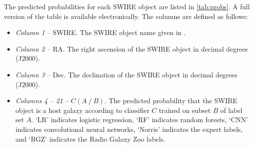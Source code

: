 \documentclass[fleqn,usenatbib,usedcolumn]{mnras}
\begin{document}
  The predicted probabilities for each SWIRE object are listed in \autoref{tab:probs}. A full version of the table is available electronically.  The columns are defined as follows:
  \begin{itemize}
    \item {\em Column 1}  -- SWIRE. The SWIRE object name given in \citet{surace05swire}.
    \item {\em Column 2} -- RA. The right ascension of the SWIRE object in decimal degrees (J2000).
    \item {\em Column 3} -- Dec. The declination of the SWIRE object in decimal degrees (J2000).
    \item {\em Columns 4 -- 21} -- $C(A\ /\ B)$. The predicted probability
      that the SWIRE object is a host galaxy according to classifier $C$ trained
      on subset $B$ of label set $A$. `LR' indicates logistic regression, `RF'
      indicates random forests, `CNN' indicates convolutional neural networks,
      `Norris' indicates the expert labels, and `RGZ' indicates the Radio Galaxy
      Zoo labels.
  \end{itemize}
  
\end{document}
